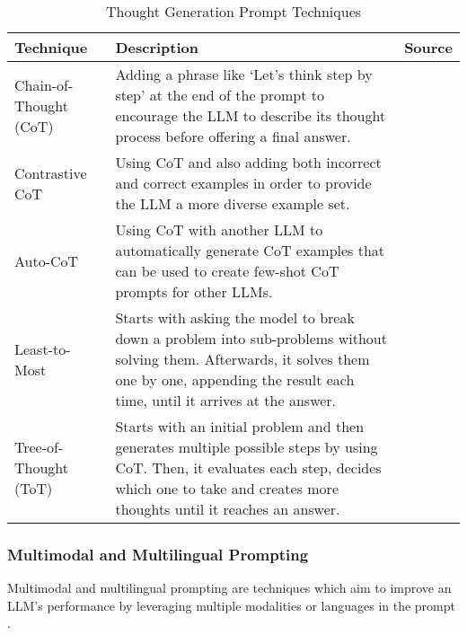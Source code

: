 \begin{table}[h!]
    \centering
    \begin{tabular}{p{3cm} p{8cm} p{2cm}}
        \toprule
        \textbf{Technique} & \textbf{Description} & \textbf{Source} \\
        \midrule
        \raggedright
        Chain-of-Thought (CoT) & Adding a phrase like `Let's think step by step' at the end of the prompt to encourage the LLM to describe its thought process before offering a final answer. & \textcite{cot} \\
        \hline
        \raggedright
        Contrastive CoT & Using CoT and also adding both incorrect and correct examples in order to provide the LLM a more diverse example set.  & \textcite{contrastive-cot} \\
        \hline
        \raggedright
        Auto-CoT & Using CoT with another LLM to automatically generate CoT examples that can be used to create few-shot CoT prompts for other LLMs. &  \textcite{auto-cot} \\
        \hline
        \raggedright
        Least-to-Most & Starts with asking the model to break down a problem into sub-problems without solving them. Afterwards, it solves them one by one, appending the result each time, until it arrives at the answer. & \textcite{least-most} \\
        \hline
        \raggedright
        Tree-of-Thought (ToT) & Starts with an initial problem and then generates multiple possible steps by using CoT. Then, it evaluates each step, decides which one to take and creates more thoughts until it reaches an answer. & \textcite{treeofthought} \\
        \bottomrule
    \end{tabular}
    \caption{Thought Generation Prompt Techniques}
    \label{tab:thought_gen}
\end{table}

\FloatBarrier

\subsubsection{Multimodal and Multilingual Prompting}

Multimodal and multilingual prompting are techniques which aim to improve an LLM's performance by leveraging multiple modalities or languages in the prompt \parencite{prompt1}.

